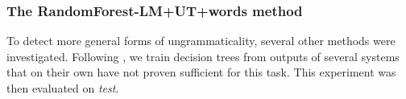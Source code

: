 \documentclass[a4paper,10pt]{scrartcl}
\theoremstyle{style}
\begin{document}




\subsubsection{The RandomForest-LM+UT+words method}
\label{s_randomforest}
To detect more general forms of ungrammaticality, several other methods were investigated. Following \cite{wagner2007comparative}, we train decision trees from outputs of several systems that on their own have not proven sufficient for this task. %
This experiment was then evaluated on \textit{test}.
\end{document}

